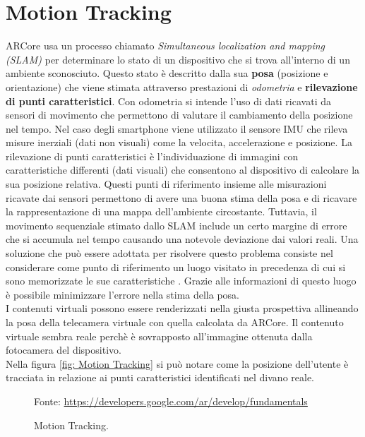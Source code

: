 \documentclass[crop=false, class=book]{standalone}
\begin{document}
	\section{Motion Tracking}
	\label{sec:motion_tracking}
	
		ARCore usa un processo chiamato \emph{Simultaneous localization and mapping (SLAM)} per determinare lo stato di un
		dispositivo che si trova all'interno di un ambiente sconosciuto. Questo stato è descritto dalla sua \textbf{posa} (posizione e orientazione) che viene stimata attraverso prestazioni di \emph{odometria} e \textbf{rilevazione di punti caratteristici}. Con odometria si intende l'uso di dati ricavati da sensori di movimento che permettono di valutare il cambiamento della posizione nel tempo. Nel caso degli smartphone viene utilizzato il sensore IMU che rileva misure inerziali (dati non visuali) come la velocita, accelerazione e posizione. La rilevazione di punti caratteristici è l'individuazione di immagini con caratteristiche differenti (dati visuali) che	consentono al dispositivo di calcolare la sua posizione relativa. Questi punti di riferimento insieme alle misurazioni ricavate dai sensori permettono di avere una buona stima della posa e di ricavare la rappresentazione di una mappa dell'ambiente circostante. Tuttavia, il movimento sequenziale stimato dallo SLAM include un certo margine di errore che si accumula nel tempo causando una notevole deviazione dai valori reali. Una soluzione che può essere adottata per risolvere questo problema consiste nel considerare come punto di riferimento un luogo visitato in precedenza di cui si sono memorizzate le sue caratteristiche \cite{mathworks2022slam}. Grazie alle informazioni di questo luogo è possibile minimizzare l'errore nella stima della posa.\\
		I contenuti virtuali possono essere renderizzati nella giusta prospettiva allineando la posa della telecamera virtuale con quella calcolata da ARCore. Il contenuto virtuale sembra reale perchè è sovrapposto all'immagine ottenuta dalla fotocamera del dispositivo.\\
		Nella figura \vref{fig: Motion Tracking} si può notare come la posizione dell'utente è tracciata in relazione ai punti caratteristici identificati nel divano reale.
		
		\begin{figure}[h]
			\centering
			{Fonte: \url{https://developers.google.com/ar/develop/fundamentals}}
			\caption{Motion Tracking.}
			\label{fig: Motion Tracking}
		\end{figure}
		
\end{document}
